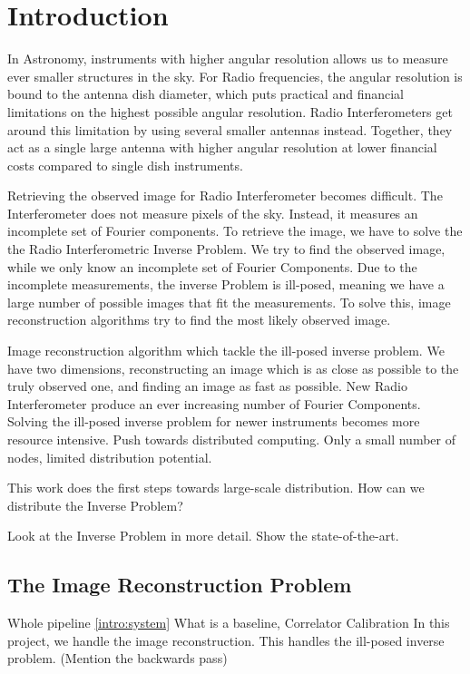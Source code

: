 \section{Introduction}\label{intro}
In Astronomy, instruments with higher angular resolution allows us to measure ever smaller structures in the sky. For Radio frequencies, the angular resolution is bound to the antenna dish diameter, which puts practical and financial limitations on the highest possible angular resolution. Radio Interferometers get around this limitation by using several smaller antennas instead. Together, they act as a single large antenna with higher angular resolution at lower financial costs compared to single dish instruments.




Retrieving the observed image for Radio Interferometer becomes difficult. The Interferometer does not measure pixels of the sky. Instead, it measures an incomplete set of Fourier components. To retrieve the image, we have to solve the the Radio Interferometric Inverse Problem. We try to find the observed image, while we only know an incomplete set of Fourier Components. Due to the incomplete measurements, the inverse Problem is ill-posed, meaning we have a large number of possible images that fit the measurements. To solve this, image reconstruction algorithms try to find the most likely observed image.

Image reconstruction algorithm which tackle the ill-posed inverse problem. We have two dimensions, reconstructing an image which is as close as possible to the truly observed one, and finding an image as fast as possible. 
New Radio Interferometer produce an ever increasing number of Fourier Components. Solving the ill-posed inverse problem for newer instruments becomes more resource intensive.
Push towards distributed computing.
Only a small number of nodes, limited distribution potential.

This work does the first steps towards large-scale distribution. How can we distribute the Inverse Problem?

Look at the Inverse Problem in more detail.
Show the state-of-the-art.



\subsection{The Image Reconstruction Problem}
Whole pipeline \ref{intro:system}
What is a baseline,
Correlator
Calibration
In this project, we handle the image reconstruction. This handles the ill-posed inverse problem.
(Mention the backwards pass)

